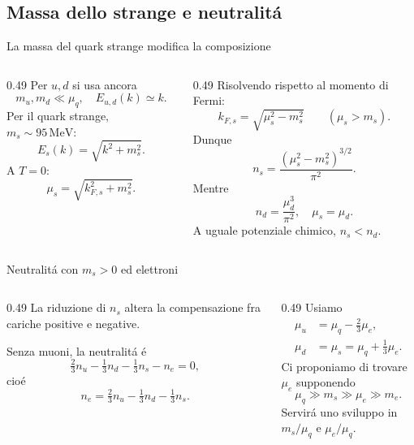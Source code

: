 \subsection{Massa dello strange e neutralit\'a}

\begin{frame}[t]{La massa del quark strange modifica la composizione}
\small
\begin{columns}[T,onlytextwidth]
\begin{column}{0.49\textwidth}
Per $u,d$ si usa ancora
\[
m_u,m_d\ll\mu_q,
\quad E_{u,d}(k)\simeq k.
\]
Per il quark strange, $m_s\sim95\,\mathrm{MeV}$:
\[
E_s(k)=\sqrt{k^2+m_s^2}.
\]
A $T=0$:
\[
\mu_s=\sqrt{k_{F,s}^2+m_s^2}.
\]
\end{column}
\begin{column}{0.49\textwidth}
Risolvendo rispetto al momento di Fermi:
\[
k_{F,s}=\sqrt{\mu_s^2-m_s^2}
\qquad(\mu_s>m_s).
\]
Dunque
\[
\boxed{n_s=\frac{(\mu_s^2-m_s^2)^{3/2}}{\pi^2}}.
\]
Mentre
\[
n_d=\frac{\mu_d^3}{\pi^2},
\quad \mu_s=\mu_d.
\]
A uguale potenziale chimico, $n_s<n_d$.
\end{column}
\end{columns}
\end{frame}

\begin{frame}[t]{Neutralit\'a con $m_s>0$ ed elettroni}
\small
\begin{columns}[T,onlytextwidth]
\begin{column}{0.49\textwidth}
La riduzione di $n_s$ altera la compensazione fra cariche positive e negative.

Senza muoni, la neutralit\'a \'e
\[
\tfrac23n_u-\tfrac13n_d-\tfrac13n_s-n_e=0,
\]
cio\'e
\[
\boxed{n_e=\tfrac23n_u-\tfrac13n_d-\tfrac13n_s}.
\]
\end{column}
\begin{column}{0.49\textwidth}
Usiamo
\[
\begin{aligned}
\mu_u&=\mu_q-\tfrac23\mu_e,\\
\mu_d&=\mu_s=\mu_q+\tfrac13\mu_e.
\end{aligned}
\]
Ci proponiamo di trovare $\mu_e$ supponendo
\[
\mu_q\gg m_s\gg\mu_e\gg m_e.
\]
Servir\'a uno sviluppo in $m_s/\mu_q$ e $\mu_e/\mu_q$.
\end{column}
\end{columns}
\end{frame}

